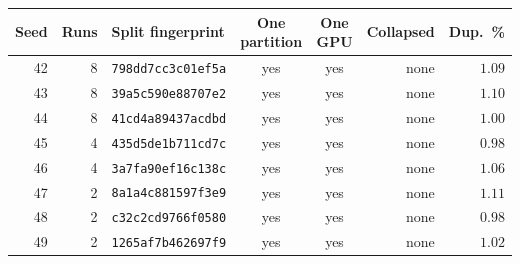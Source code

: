 \begin{tabular}{rrlccrr}
\toprule
Seed & Runs & Split fingerprint & One partition & One GPU & Collapsed & Dup.\ \% \\
\midrule
42 & 8 & \texttt{798dd7cc3c01ef5a} & yes & yes & none & $1.09$ \\
43 & 8 & \texttt{39a5c590e88707e2} & yes & yes & none & $1.10$ \\
44 & 8 & \texttt{41cd4a89437acdbd} & yes & yes & none & $1.00$ \\
45 & 4 & \texttt{435d5de1b711cd7c} & yes & yes & none & $0.98$ \\
46 & 4 & \texttt{3a7fa90ef16c138c} & yes & yes & none & $1.06$ \\
47 & 2 & \texttt{8a1a4c881597f3e9} & yes & yes & none & $1.11$ \\
48 & 2 & \texttt{c32c2cd9766f0580} & yes & yes & none & $0.98$ \\
49 & 2 & \texttt{1265af7b462697f9} & yes & yes & none & $1.02$ \\
\bottomrule
\end{tabular}
